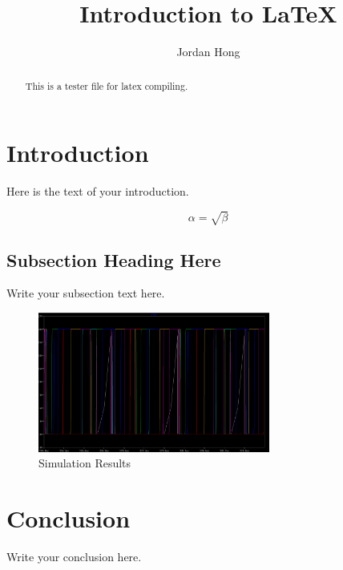 \documentclass{article}
\begin{document}
\title{Introduction to \LaTeX{}}
\author{Jordan Hong}

\maketitle

\begin{abstract}
    This is a tester file for latex compiling.
\end{abstract}

\section{Introduction}
Here is the text of your introduction.

\begin{equation}
    \label{simple_equation}
    \alpha = \sqrt{ \beta }
\end{equation}

\subsection{Subsection Heading Here}
Write your subsection text here.

\begin{figure}
    \centering
    \includegraphics[width=3.0in]{my-simulation.png}
    \caption{Simulation Results}
    \label{simulationfigure}
\end{figure}

\section{Conclusion}
Write your conclusion here.
\end{document}
